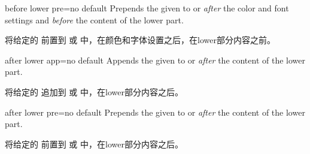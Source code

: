 \begin{docTcbKey}{before lower pre}{=}{no default}
Prepends the given  to  or  \emph{after} the color and font settings
and \emph{before} the content of the lower part.

将给定的  前置到  或  中，在颜色和字体设置之后，在lower部分内容之前。
\end{docTcbKey}

\begin{docTcbKey}{after lower app}{=}{no default}
Appends the given  to  or  \emph{after} the content of the lower part.

将给定的  追加到  或  中，在lower部分内容之后。
\end{docTcbKey}

\begin{docTcbKey}{after lower pre}{=}{no default}
Prepends the given  to  or  \emph{after} the content of the lower part.

将给定的  前置到  或  中，在lower部分内容之后。
\end{docTcbKey}
